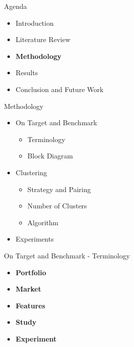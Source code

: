 \begin{frame}{Agenda}
\begin{itemize}
    \item Introduction
    \item Literature Review
    \item \textbf{Methodology}
    \item Results
    \item Conclusion and Future Work
\end{itemize}
\end{frame}


\begin{frame}{Methodology}
\begin{itemize}
    \item{On Target and Benchmark\\ }
        \begin{itemize}
            \item<2-> Terminology
            \item<2-> Block Diagram 
        \end{itemize}
    \vspace{0.3cm}
    \item{Clustering\\}
        \begin{itemize}
            \item<3-> Strategy and Pairing 
            \item<3-> Number of Clusters
            \item<3-> Algorithm
        \end{itemize}
    \item{Experiments\\}
\end{itemize}
\end{frame}


\begin{frame}{On Target and Benchmark - Terminology} 
    \pause
    \begin{itemize}
        \item \textbf<3>{Portfolio}
        \vspace{0.1cm}
        \item \textbf<4>{Market}
        \vspace{0.1cm}
        \item \textbf<5>{Features}
        \vspace{0.1cm}
        \item \textbf<6>{Study}
        \vspace{0.1cm}
        \item \textbf<7>{Experiment}
    \end{itemize}
\end{frame}

